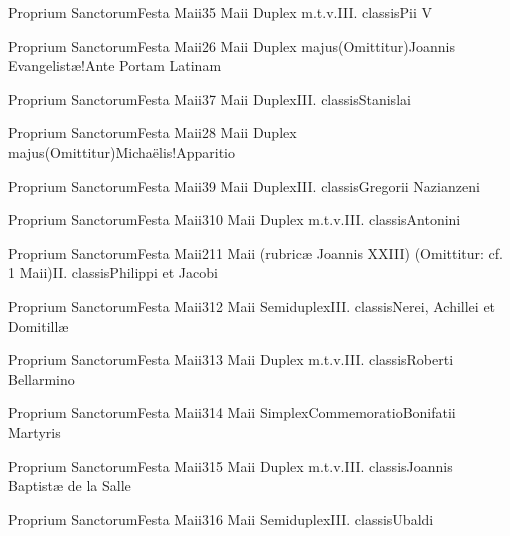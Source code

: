 \documentclass[psalterium-feriale.tex]{subfiles}
\begin{document}
	{Proprium Sanctorum}{Festa Maii}{3}{5 Maii}
	{Duplex m.t.v.}{III. classis}{Pii V}
	{}
	{}

	{Proprium Sanctorum}{Festa Maii}{2}{6 Maii}
	{Duplex majus}{(Omittitur)}{Joannis Evangelistæ!Ante Portam Latinam}
	{}
	{}
\psalmodiapropria

	{Proprium Sanctorum}{Festa Maii}{3}{7 Maii}
	{Duplex}{III. classis}{Stanislai}
	{}
	{}

	{Proprium Sanctorum}{Festa Maii}{2}{8 Maii}
	{Duplex majus}{(Omittitur)}{Michaëlis!Apparitio}
	{}
	{}
\psalmodiapropria

	{Proprium Sanctorum}{Festa Maii}{3}{9 Maii}
	{Duplex}{III. classis}{Gregorii Nazianzeni}
	{}
	{}

	{Proprium Sanctorum}{Festa Maii}{3}{10 Maii}
	{Duplex m.t.v.}{III. classis}{Antonini}
	{}
	{}

	{Proprium Sanctorum}{Festa Maii}{2}{11 Maii (rubricæ Joannis XXIII)}
	{(Omittitur: cf. 1 Maii)}{II. classis}{Philippi et Jacobi}
	{}
	{}
\psalmodiapropria

	{Proprium Sanctorum}{Festa Maii}{3}{12 Maii}
	{Semiduplex}{III. classis}{Nerei, Achillei et Domitillæ}
	{}
	{}

	{Proprium Sanctorum}{Festa Maii}{3}{13 Maii}
	{Duplex m.t.v.}{III. classis}{Roberti Bellarmino}
	{}
	{}

	{Proprium Sanctorum}{Festa Maii}{3}{14 Maii}
	{Simplex}{Commemoratio}{Bonifatii Martyris}
	{}
	{}

	{Proprium Sanctorum}{Festa Maii}{3}{15 Maii}
	{Duplex m.t.v.}{III. classis}{Joannis Baptistæ de la Salle}
	{}
	{}

	{Proprium Sanctorum}{Festa Maii}{3}{16 Maii}
	{Semiduplex}{III. classis}{Ubaldi}
	{}
	{}
\end{document}
